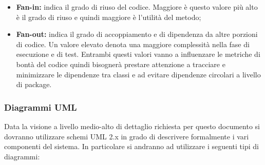 \begin{itemize}
\begin{itemize}
     \item \textbf{Fan-in:} indica il grado di riuso del codice. Maggiore è questo valore più alto è il grado di riuso e quindi maggiore è l’utilità del metodo;
     \item \textbf{Fan-out:} indica il grado di accoppiamento e di dipendenza da altre porzioni di codice. Un valore elevato denota una maggiore complessità nella fase di esecuzione e di test.
     Entrambi questi valori vanno a influenzare le metriche di bontà del codice quindi bisognerà prestare attenzione a tracciare e minimizzare le dipendenze tra classi e ad evitare dipendenze circolari a livello di package.
     \end{itemize}
     \end{itemize}
		\subsubsection{Diagrammi UML}
		Data la visione a livello medio-alto di dettaglio richiesta per questo documento si dovranno utilizzare schemi UML 2.x in grado di descrivere formalmente i vari componenti del sistema. In particolare si andranno ad utilizzare i seguenti tipi di diagrammi:

